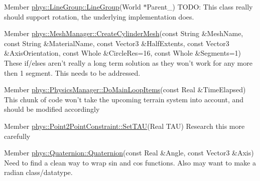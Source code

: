 \label{todo__todo000012}
\hypertarget{todo__todo000012}{}
 
\begin{DoxyDescription}
\item[Member \hyperlink{classphys_1_1LineGroup_a676039a6beec56d24c631e9da5fd7e76}{phys::LineGroup::LineGroup}(World $\ast$Parent\_\-) ]TODO: This class really should support rotation, the underlying implementation does. 
\end{DoxyDescription}

\label{todo__todo000015}
\hypertarget{todo__todo000015}{}
 
\begin{DoxyDescription}
\item[Member \hyperlink{classphys_1_1MeshManager_a54baf240a29b9f9e5d83ae1e8ffdcff4}{phys::MeshManager::CreateCylinderMesh}(const String \&MeshName, const String \&MaterialName, const Vector3 \&HalfExtents, const Vector3 \&AxisOrientation, const Whole \&CircleRes=16, const Whole \&Segments=1) ]These if/elses aren't really a long term solution as they won't work for any more then 1 segment. This needs to be addressed. 
\end{DoxyDescription}

\label{todo__todo000016}
\hypertarget{todo__todo000016}{}
 
\begin{DoxyDescription}
\item[Member \hyperlink{classphys_1_1PhysicsManager_ad363d6683a0276395eeb2c42a56f95fc}{phys::PhysicsManager::DoMainLoopItems}(const Real \&TimeElapsed) ]This chunk of code won't take the upcoming terrain system into account, and should be modified accordingly 
\end{DoxyDescription}

\label{todo__todo000004}
\hypertarget{todo__todo000004}{}
 
\begin{DoxyDescription}
\item[Member \hyperlink{classphys_1_1Point2PointConstraint_a556c4610b62c075efaa9d246cf3d2dc2}{phys::Point2PointConstraint::SetTAU}(Real TAU) ]Research this more carefully 
\end{DoxyDescription}

\label{todo__todo000017}
\hypertarget{todo__todo000017}{}
 
\begin{DoxyDescription}
\item[Member \hyperlink{classphys_1_1Quaternion_a9246247b7b28f19839148415a7ddeb96}{phys::Quaternion::Quaternion}(const Real \&Angle, const Vector3 \&Axis) ]Need to find a clean way to wrap sin and cos functions. Also may want to make a radian class/datatype. 
\end{DoxyDescription}


